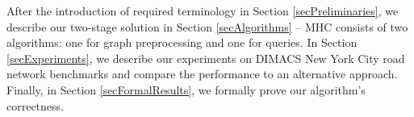 After the introduction of required terminology in Section
\ref{secPreliminaries}, we describe our two-stage solution in Section
\ref{secAlgorithms} -- MHC consists of two algorithms: one for 
graph preprocessing and one for queries. In Section
\ref{secExperiments}, we describe our experiments on DIMACS New York City road
network benchmarks and compare the performance to an alternative approach.
Finally, in Section \ref{secFormalResults}, we formally prove our algorithm's
correctness.

